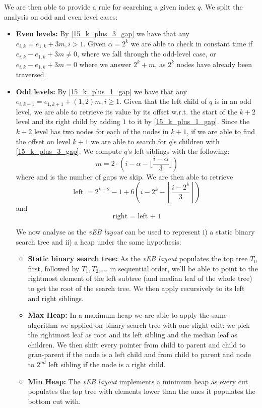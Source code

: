 We are then able to provide a rule for searching a given index $q$.
We split the analysis on odd and even level cases:
\begin{itemize}
    \item  \textbf{Even levels:} By \ref{15_k_plus_3_gap} we have that any $e_{i, k} = e_{1, k} + 3m, i > 1$.
    Given $\alpha = 2^k$ we are able to check in constant time if $e_{i, k} - e_{1, k} + 3m \neq 0$, where we fall through the odd-level case, or $e_{i, k} - e_{1, k} + 3m = 0$ where we answer $2^k + m$, as $2^k$ nodes have already been traversed.
    \item \textbf{Odd levels:} By \ref{15_k_plus_1_gap} we have that any $e_{i, k + 1} = e_{1, k + 1} + (1, 2)m, i \geq 1$.
    Given that the left child of $q$ is in an odd level, we are able to retrieve its value by its offset w.r.t. the start of the $k + 2$ level and its right child by adding $1$ to it by \ref{15_k_plus_1_gap}.
    Since the $k + 2$ level has two nodes for each of the nodes in $k + 1$, if we are able to find the offset on level $k + 1$ we are able to search for $q$'s children with \ref{15_k_plus_3_gap}.
    We compute $q$'s left siblings with the following:
    \begin{equation*}
    m = 2 \cdot (i-\alpha -\lfloor \frac{i-\alpha}{3} \rfloor)
    \end{equation*}
    where and is the number of gaps we skip.
    We are then able to retrieve
    \begin{equation*}
    \textrm{left } = 2^{k+2}-1+6\left(i-2^k- \left\lfloor \frac{i-2^k}{3} \right\rfloor\right)
    \end{equation*}
    and
    \begin{equation*}
    \textrm{right = left + 1}
    \end{equation*}

We now analyse as the \emph{vEB layout} can be used to represent i) a static binary search tree and ii) a heap under the same hypothesis:
    \begin{itemize}
    \item \textbf{Static binary search tree:} As the \emph{vEB layout} populates the top tree $T_0$ first, followed by $T_1, T_2, \dots$ in sequential order, we'll be able to point to the rightmost element of the left subtree (and median leaf of the whole tree) to get the root of the search tree.
    We then apply recursively to its left and right siblings.
    \item \textbf{Max Heap:} In a maximum heap we are able to apply the same algorithm we applied on binary search tree with one slight edit: we pick the rightmost leaf as root and its left sibling and the median leaf as children.
    We then shift every pointer from child to parent and child to gran-parent if the node is a left child and from child to parent and node to $2^{nd}$ left sibling if the node is a right child.
    \item \textbf{Min Heap:} The \emph{vEB layout} implements a minimum heap as every cut populates the top tree with elements lower than the ones it populates the bottom cut with.
    \end{itemize}
\end{itemize}
